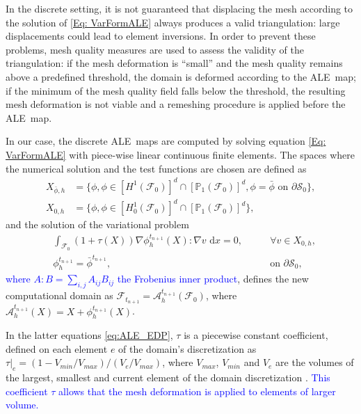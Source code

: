 \documentclass[graybox]{svmult}
\newcommand{\review}[1]{\textcolor{blue}{#1}}
\newcommand{\Fluid}{\mathcal{F}} %
\newcommand{\Alemap}{\mathcal{A}} %
\newcommand{\ALE}{ALE} %
\newcommand{\CompDomain}{\Fluid}
\newcommand{\dx}{\, \mathrm{d}x}
\begin{document}
In the discrete setting, it is not guaranteed that displacing the mesh according to the solution of \eqref{Eq: VarFormALE} always produces a valid triangulation: large displacements could lead to element inversions.
In order to prevent these problems, mesh quality measures \cite{Field2000} are used to assess the validity of the triangulation: if the mesh deformation is ``small'' and the mesh quality remains above a predefined threshold, the domain is deformed according to the \ALE\ map; if the minimum of the mesh quality field falls below the threshold, the resulting mesh deformation is not viable and a remeshing procedure is applied before the \ALE\ map.

In our case, the discrete \ALE\ maps are computed by solving equation \eqref{Eq: VarFormALE} with piece-wise linear continuous finite elements. The spaces where the numerical solution and the test functions are chosen are defined as
\begin{equation}
	\begin{aligned}
		X_{\bar{\phi},h} &= \{  \phi , \phi \in [H^1(\CompDomain_{0})]^d\cap [\mathbb{P}_1(\CompDomain_{0})]^d, \phi=\bar{\phi} \text{ on $\partial \mathcal{S}_{0}$}\},\\
		X_{0,h} &= \{  \phi ,\phi \in [H^1_0(\CompDomain_{0})]^d\cap [\mathbb{P}_1(\CompDomain_{0})]^d\},
	\end{aligned}
\end{equation}
and the solution of the variational problem 
	\begin{equation}
		\begin{aligned}
			&\int_{\CompDomain_{0}} (1+\tau(X))\nabla \phi^{t_{n+1}}_h (X)  : \nabla v \,\dx= 0, \qquad &\text{$\forall v \in X_{0,h}$},
			\\
			&\mathcal{\phi}_h^{t_{n+1}}= \bar{\phi}^{t_{n+1}}, &\text{on $\partial\mathcal{S}_{0}$},
		\end{aligned}
  \label{eq:ALE_EDP}
	\end{equation}
\review{where $A:B = \sum_{i,j} A_{ij}B_{ij}$ the Frobenius inner product}, defines the new computational domain as $\CompDomain_{t_{n+1}}=\Alemap_h^{t_{n+1}}(\CompDomain_{0})$, where $\Alemap_h^{t_{n+1}}(X) = X + \phi_h^{t_{n+1}}(X)$. 

In the latter equations \eqref{eq:ALE_EDP}, $\tau$ is a piecewise constant coefficient, defined on each element $e$ of the domain's discretization as $ \tau\big |_e=(1-V_{min}/V_{max})/(V_e/V_{max})$, where $V_{max}$, $V_{min}$  and $V_e$ are the volumes of the largest, smallest and current element of the domain discretization \cite{kanchi_3d_2007}. \review{This coefficient $\tau$ allows that the mesh deformation is  applied to elements of larger volume.}
\end{document}
